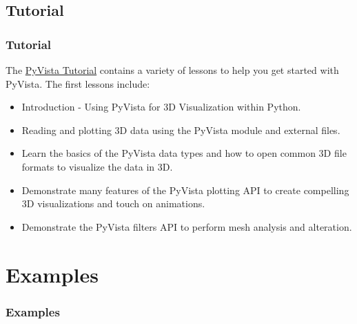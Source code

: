 \documentclass[t]{beamer}
\begin{document}
\subsection{Tutorial}
\begin{frame}
  \frametitle{Tutorial}

  The \href{https://tutorial.pyvista.org}{PyVista Tutorial} contains a variety of lessons to help you get started with PyVista. The first lessons include:

  \begin{itemize}
  \item Introduction - Using PyVista for 3D Visualization within Python.
  \item Reading and plotting 3D data using the PyVista module and external files.
  \item Learn the basics of the PyVista data types and how to open common 3D file formats to visualize the data in 3D.
  \item Demonstrate many features of the PyVista plotting API to create compelling 3D visualizations and touch on animations.
  \item Demonstrate the PyVista filters API to perform mesh analysis and alteration.
  \end{itemize}

\end{frame}


\section{Examples}

\begin{frame}
  \frametitle{Examples}
  \tableofcontents[currentsection]
  \vspace{200pt}  %
\end{frame}

\end{document}
